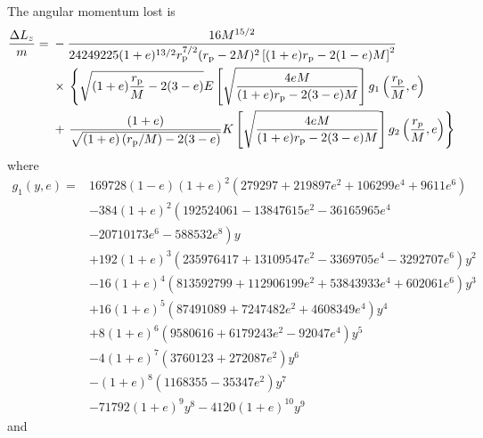 The angular momentum lost is
\begin{align}
\dfrac{\Delta L_z}{m} = {} & - \dfrac{16 M^{{15}/{2}}}{24249225 (1 + e)^{{13}/{2}} r_\mathrm{p}^{{7}/{2}} (r_\mathrm{p} - 2 M)^2 \left[(1 + e) r_\mathrm{p} - 2 (1 - e) M\right]^{2}} \nonumber \\
 {} & \times {} \left\{\sqrt{(1 + e) \dfrac{r_\mathrm{p}}{M} - 2(3 - e)} E\left[\sqrt{\dfrac{4 e M}{(1+e) r_\mathrm{p} - 2(3 - e)M}}\right] g_1\left(\dfrac{r_\mathrm{p}}{M}, e\right) \right. \nonumber \\
 {} & + \left. \dfrac{(1 + e)}{\sqrt{(1 + e)\left(r_\mathrm{p}/M\right) - 2(3 - e)}} K\left[\sqrt{\dfrac{4 e M}{(1+e) r_\mathrm{p} - 2(3 - e)M}}\right] g_2\left(\dfrac{r_{p}}{M}, e\right)\right\}
\end{align}
where
\begin{align}
g_1(y, e) = {} & 169728 (1 - e) (1 + e)^2 \left(279297 + 219897 e^2 + 106299 e^4 + 9611 e^6 \right) \nonumber \\
 {} & - \left. 384 (1 + e)^2 \left(192524061 - 13847615 e^2 - 36165965 e^4 \right.\right. \nonumber \\
 {} &- \left.\left. 20710173 e^6 - 588532 e^8\right) y \right. \nonumber \\
 {} & + \left. 192 (1 + e)^3 \left(235976417 + 13109547 e^2 - 3369705 e^4 - 3292707e^6\right) y^2 \right. \nonumber \\
 {} & - \left. 16 (1 + e)^4 \left(813592799 + 112906199 e^2 + 53843933 e^4 + 602061 e^6\right) y^3 \right. \nonumber \\
 {} & + \left. 16 (1 + e)^5 \left(87491089 + 7247482 e^2 + 4608349 e^4\right) y^4 \right. \nonumber \\
 {} & + \left. 8 (1 + e)^6 \left(9580616 + 6179243 e^2 - 92047 e^4\right) y^5 \right. \nonumber \\
 {} & - \left. 4 (1 + e)^7 \left(3760123 + 272087 e^2 \right) y^6 \right. \nonumber \\
 {} & - \left. (1 + e)^8 \left(1168355 - 35347 e^2\right) y^7 \right. \nonumber \\
 {} & - \left. 71792 (1 + e)^9 y^8 - 4120 (1 + e)^{10} y^9 \right.
\end{align}
and
